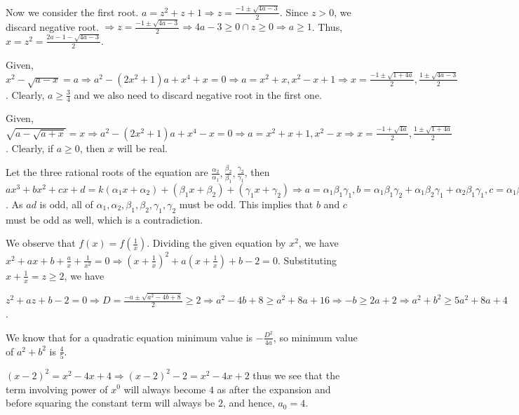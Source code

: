   Now we consider the first root. $a = z^2 + z + 1 \Rightarrow z = \frac{-1 \pm \sqrt{4a - 3}}{2}$. Since $z
  > 0$, we discard negative root. $\Rightarrow z = \frac{-1\pm\sqrt{4a - 3}}{2} \Rightarrow 4a - 3\geq 0\cap
  z\geq 0 \Rightarrow a\geq 1$. Thus, $x = z^2 = \frac{2a - 1 - \sqrt{4a - 3}}{2}$.
\item Given, $x^2 - \sqrt{a - x} = a \Rightarrow a^2 - (2x^2 + 1)a + x^4 + x = 0 \Rightarrow a = x^2 + x,
  x^2 - x + 1\Rightarrow x = \frac{-1 \pm \sqrt{1 + 4a}}{2}, \frac{1\pm\sqrt{4a - 3}}{2}$. Clearly,
  $a\geq\frac{3}{4}$ and we also need to discard negative root in the first one.
\item Given, $\sqrt{a - \sqrt{a + x}} = x \Rightarrow a^2 - (2x^2 + 1)a + x^4 - x = 0 \Rightarrow a = x^2 +
  x + 1, x^2 - x \Rightarrow x = \frac{-1 + \sqrt{4a}}{2}, \frac{1\pm\sqrt{1 + 4a}}{2}$. Clearly, if $a\geq
  0$, then $x$ will be real.
\item Let the three rational roots of the equation are $\frac{\alpha_2}{\alpha_1}, \frac{\beta_2}{\beta_1},
  \frac{\gamma_2}{\gamma_1}$, then $ax^3 + bx^2 + cx + d = k(\alpha_1x + \alpha_2) + (\beta_1x + \beta_2) +
  (\gamma_1x + \gamma_2)\Rightarrow a = \alpha_1\beta_1\gamma_1, b = \alpha_1\beta_1\gamma_2 + \alpha_1\beta_2\gamma_1
  + \alpha_2\beta_1\gamma_1, c = \alpha_1\beta_2\gamma_2 + \alpha_2\beta_1\gamma_2 + \alpha_2\beta_2\gamma_1, d =
  \alpha_2\beta_2\gamma_2$. As $ad$ is odd, all of $\alpha_1, \alpha_2, \beta_1, \beta_2, \gamma_1, \gamma_2$ must be
  odd. This implies that $b$ and $c$ must be odd as well, which is a contradiction.
\item We observe that $f(x) = f\left(\frac{1}{x}\right)$. Dividing the given equation by $x^2$, we have $x^2
  + ax + b + \frac{a}{x} + \frac{1}{x^2} = 0 \Rightarrow \left(x + \frac{1}{x}\right)^2 + a\left(x +
  \frac{1}{x}\right) + b - 2 = 0$. Substituting $x + \frac{1}{x} = z\geq 2$, we have

  $z^2 + az + b - 2 = 0 \Rightarrow D = \frac{-a \pm \sqrt{a^2 -4b + 8}}{2}\geq 2 \Rightarrow a^2 - 4b +
  8\geq a^2 + 8a + 16\Rightarrow -b\geq 2a + 2 \Rightarrow a^2 + b^2\geq 5a^2 + 8a + 4$.

  We know that for a quadratic equation minimum value is $-\frac{D^2}{4a}$, so minimum value of $a^2 +
  b^2$ is $\frac{4}{5}$.
\item $(x - 2)^2 = x^2 - 4x + 4\Rightarrow (x - 2)^2 - 2 = x^2 - 4x + 2$ thus we see that the term involving
  power of $x^0$ will always become $4$ as after the expansion and before squaring the constant term will
  always be $2$, and hence, $a_0 = 4$.

